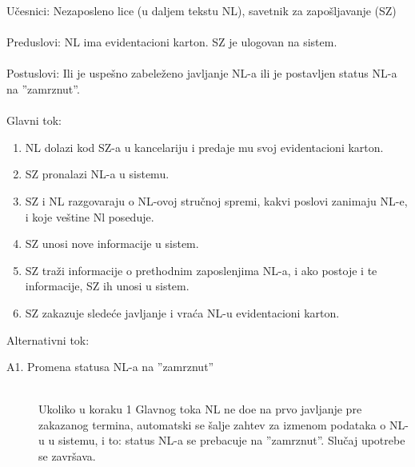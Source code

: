 \noindent U\v cesnici: Nezaposleno lice (u daljem tekstu NL), savetnik za zapo\v sljavanje (SZ)
\\
\\ Preduslovi: NL ima evidentacioni karton. SZ je ulogovan na sistem. 
\\
\\ Postuslovi: Ili je uspe\v sno zabele\v zeno javljanje NL-a ili je postavljen status NL-a na ''zamrznut''.
\\ 
\\ Glavni tok:
\begin{enumerate}
	\item NL dolazi kod SZ-a u kancelariju i predaje mu svoj evidentacioni karton.
	\item SZ pronalazi NL-a u sistemu.
	\item SZ i NL razgovaraju o NL-ovoj stru\v cnoj spremi, kakvi poslovi zanimaju NL-e, i koje ve\v stine Nl poseduje.
	\item SZ unosi nove informacije u sistem.
	\item SZ tra\v zi informacije o prethodnim zaposlenjima NL-a, i ako postoje i te informacije, SZ ih unosi u sistem.
	\item SZ zakazuje slede\' ce javljanje i vra\' ca NL-u evidentacioni karton.
\end{enumerate}

\noindent Alternativni tok:
\begin{description}
	\item[A1. Promena statusa NL-a na ''zamrznut''] ~\\
	Ukoliko u koraku 1 Glavnog toka NL ne do\dj e na prvo javljanje pre zakazanog termina, automatski se \v salje zahtev za izmenom podataka o NL-u u sistemu, i to: status NL-a se prebacuje na ''zamrznut''. Slu\v caj upotrebe se zavr\v sava.
\end{description}